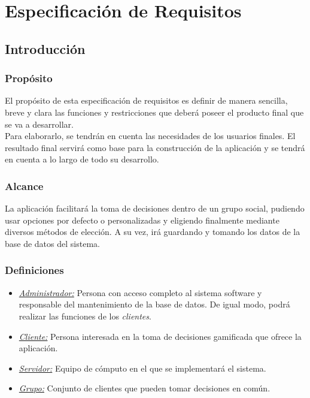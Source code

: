 \chapter{Especificación de Requisitos}

\section{Introducción}

\subsection{Propósito}

El propósito de esta especificación de requisitos es definir de manera sencilla, breve y clara las funciones y restricciones que deberá poseer el producto final que se va a desarrollar. \\

Para elaborarlo, se tendrán en cuenta las necesidades de los usuarios finales. El resultado final servirá como base para la construcción de la aplicación y se tendrá en cuenta a lo largo de todo su desarrollo. 

\subsection{Alcance}

La aplicación facilitará la toma de decisiones dentro de un grupo social, pudiendo usar opciones por defecto o personalizadas y eligiendo finalmente mediante diversos métodos de elección. A su vez, irá guardando y tomando los datos de la base de datos del sistema.

\subsection{Definiciones}

\begin{itemize}
    \item \textit{\uline{Administrador:}} Persona con acceso completo al sistema software y responsable del mantenimiento de la base de datos. De igual modo, podrá realizar las funciones de los \textit{clientes}.
    \item \textit{\uline{Cliente:}} Persona interesada en la toma de decisiones gamificada que ofrece la aplicación.
    \item \textit{\uline{Servidor:}} Equipo de cómputo en el que se implementará el sistema.
    \item \textit{\uline{Grupo:}} Conjunto de clientes que pueden tomar decisiones en común.
\end{itemize}

